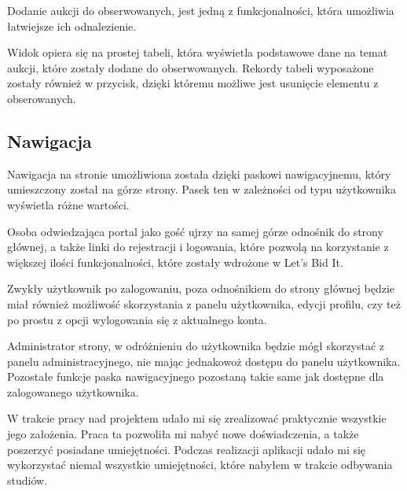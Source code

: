 \documentclass[brudnopis]{xmgr}
\begin{document}
Dodanie aukcji do obserwowanych, jest jedną z funkcjonalności, która umożliwia łatwiejsze ich odnalezienie. 

Widok opiera się na prostej tabeli, która wyświetla podstawowe dane na temat aukcji, które zostały dodane do obserwowanych. Rekordy tabeli wyposażone zostały również w przycisk, dzięki któremu możliwe jest usunięcie elementu z obserowanych.

\subsection{Nawigacja}

Nawigacja na stronie umożliwiona została dzięki paskowi nawigacyjnemu, który umieszczony został na górze strony. Pasek ten w zależności od typu użytkownika wyświetla różne wartości.

Osoba odwiedzająca portal jako gość ujrzy na samej górze odnośnik do strony głównej, a także linki do rejestracji i logowania, które pozwolą na korzystanie z większej ilości funkcjonalności, które zostały wdrożone w Let's Bid It.

Zwykły użytkownik po zalogowaniu, poza odnośnikiem do strony głównej będzie miał również możliwość skorzystania z panelu użytkownika, edycji profilu, czy też po prostu z opcji wylogowania się z aktualnego konta.

Administrator strony, w odróżnieniu do użytkownika będzie mógł skorzystać z panelu administracyjnego, nie mając jednakowoż dostępu do panelu użytkownika. Pozostałe funkcje paska nawigacyjnego pozostaną takie same jak dostępne dla zalogowanego użytkownika.

\summary
W trakcie pracy nad projektem udało mi się zrealizować praktycznie wszystkie jego założenia. Praca ta pozwoliła mi nabyć nowe doświadczenia, a także poszerzyć posiadane umiejętności. Podczas realizacji aplikacji udało mi się wykorzystać niemal wszystkie umiejętności, które nabyłem w trakcie odbywania studiów.
\end{document}
